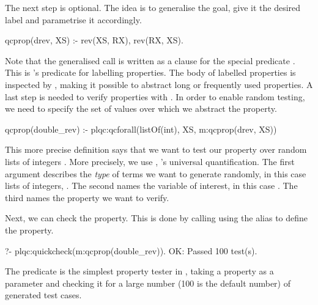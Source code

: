 The next step is optional.
%
The idea is to generalise the goal, give it the desired label and parametrise it accordingly.
%
\begin{yapcode}
 qcprop({drev, XS}) :- rev(XS, RX), rev(RX, XS).
\end{yapcode}
%
Note that the generalised call is  written as a clause for the special
predicate .
%
This is \plqc{}'s predicate for labelling properties.
%
The body of labelled properties is inspected by \plqc{},
making it possible to abstract long or
frequently used properties.%
%
A last step is needed %
to verify properties with \plqc{}.
%
In order to enable random testing, we
need to specify the set of values over which we abstract the property.
%
\begin{yapcode}
 qcprop(double_rev) :-
   plqc:qcforall(listOf(int), XS, m:qcprop({drev, XS}))
\end{yapcode}
%
This more precise definition says that we want to test our 
property over random lists of integers .
%
More precisely, we use , \plqc{}'s universal quantification.
%
The first argument describes the \emph{type} of terms we want to
generate randomly, in this case lists of integers,
.
%
The second names the variable of interest, in this case .
%
The third names the property we want to verify.


Next, we can check the property.
%
This is done by calling \plqc{} using the alias
 to define the property.
\begin{yapcode}
   ?- plqc:quickcheck(m:qcprop(double_rev)).
 OK: Passed 100 test(s).
\end{yapcode}
%
The  predicate is the simplest property tester in
\plqc{}, taking a property as a parameter and checking it for a large
number (100 is the default number) of generated test cases.


